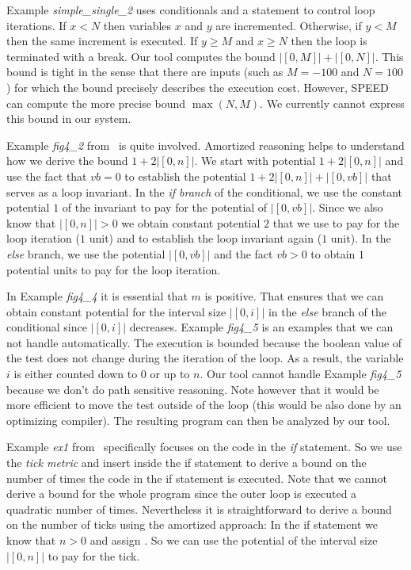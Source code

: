 \documentclass[nocopyrightspace,preprint,pldi]{sigplanconf-pldi15}
\begin{document}
{Example \emph{simple\_single\_2} uses conditionals and a 
statement to control loop iterations.  If $x<N$ then variables $x$ and
$y$ are incremented.  Otherwise, if $y<M$ then the same increment is
executed.  If $y\geq M$ and $x\geq N$ then the loop is terminated with
a break.  Our tool computes the bound $|[0, M]| + |[0, N]|$.
This bound is tight in the sense that there are inputs (such as $M =
-100$ and $N = 100$) for which the bound precisely describes the
execution cost.  However, SPEED can compute the more precise bound
$\max(N,M)$.  We currently cannot express this bound in our system.

Example \emph{fig4\_2} from~\cite{GulwaniJK09} is quite involved.
Amortized reasoning helps to understand how we derive the bound $1 +
2|[0, n]|$.  We start with potential $1 + 2|[0, n]|$ and use the fact
that $vb=0$ to establish the potential $1 + 2|[0, n]| + |[0,vb]|$ that
serves as a loop invariant.  In the \emph{if branch} of the
conditional, we use the constant potential $1$ of the invariant to pay
for the potential of $|[0,vb]|$.  Since we also know that $|[0, n]|>0$
we obtain constant potential $2$ that we use to pay for the loop
iteration ($1$ unit) and to establish the loop invariant again ($1$
unit).  In the \emph{else} branch, we use the potential $|[0,vb]|$
and the fact $vb>0$ to obtain $1$ potential units to pay for the
loop iteration.

In Example \emph{fig4\_4} it is essential that $m$ is positive.  That
ensures that we can obtain constant potential for the interval size
$|[0,i]|$ in the \emph{else} branch of the conditional since $|[0,i]|$
decreases.  Example \emph{fig4\_5} is an examples that we can not
handle automatically.  The execution is bounded because the boolean
value of the test  does not change during the iteration
of the loop.  As a result, the variable $i$ is either counted down to
$0$ or up to $n$.  Our tool cannot handle Example \emph{fig4\_5}
because we don't do path sensitive reasoning.  Note however that it
would be more efficient to move the test  outside of
the loop (this would be also done by an optimizing compiler).  The
resulting program can then be analyzed by our tool.

Example \emph{ex1} from~\cite{GulwaniZ10} specifically focuses on the
code in the \emph{if} statement.  So we use the \emph{tick metric} and
insert  inside the if statement to derive a bound on
the number of times the code in the if statement is executed.  Note
that we cannot derive a bound for the whole program since the outer
loop is executed a quadratic number of times.  Nevertheless it is
straightforward to derive a bound on the number of ticks using the
amortized approach: In the if statement we know that $n>0$ and assign
.  So we can use the potential of the interval size $|[0,n]|$
to pay for the tick.

}
\end{document}
